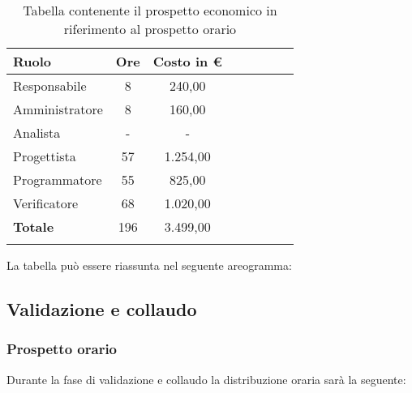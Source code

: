 			\begin{longtable}{|l|c|c|c|c|c|c|c|}
				\hline
				\rowcolor{lighter-grayer}
				\textbf{Ruolo} & \textbf{Ore} & \textbf{Costo in €} \\
				\hline
				\endfirsthead
				
				\hline
				Responsabile & 8 & 240,00\\
				\hline
				\hline
				Amministratore & 8 & 160,00\\
				\hline
				\hline
				Analista & - & -\\
				\hline
				\hline
				Progettista & 57 & 1.254,00\\
				\hline
				\hline
				Programmatore & 55 & 825,00\\
				\hline
				\hline
				Verificatore & 68 & 1.020,00\\
				\hline
				\textbf{Totale} & 196 & 3.499,00\\
				\hline
				\caption{Tabella contenente il prospetto economico in riferimento al prospetto orario}
			\end{longtable}
			\pagebreak
		
			La tabella può essere riassunta nel seguente areogramma:

			\subsection{Validazione e collaudo}
            \subsubsection{Prospetto orario}
			Durante la fase di validazione e collaudo la distribuzione oraria sarà la seguente:
			
